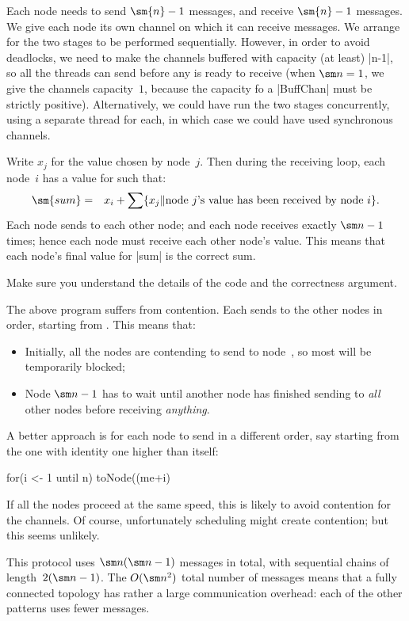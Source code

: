 
Each node needs to send $\sm{n}-1$ messages, and receive $\sm{n}-1$ messages.
We give each node its own channel on which it can receive messages.  We
arrange for the two stages to be performed sequentially.  However, in order to
avoid deadlocks, we need to make the channels buffered with capacity (at
least) |n-1|, so all the threads can send before any is ready to receive (when
$\sm n = 1$, we give the channels capacity~$1$, because the capacity fo a
|BuffChan| must be strictly positive).  Alternatively, we could have run the
two stages concurrently, using a separate thread for each, in which case we
could have used synchronous channels.

Write $x_j$ for the value chosen by node~$j$.  Then during the receiving loop,
each node~$i$ has a value for  such that:
%
\begin{eqnarray*}
\sm{sum} & = & 
  x_i + \sum \set{x_j \| \mbox{node~$j$'s value has been received by node~$i$}}.
\end{eqnarray*}
%
Each node sends to each other node; and each node receives exactly $\sm n-1$
times; hence each node must receive each other node's value.  This means that
each node's final value for |sum| is the correct sum.

\begin{instruction}
Make sure you understand the details of the code and the correctness
argument.
\end{instruction}


The above program suffers from contention.  
Each  sends to the other nodes in order, starting from
.  This means that:
%
\begin{itemize}
\item
Initially, all the nodes are contending to send to node~, so most
will be temporarily blocked;

\item
Node $\sm n-1$ has to wait until another node has finished sending to
\emph{all} other nodes before receiving \emph{anything}.  %
\end{itemize}

A better approach is for each node to send in a different order, say starting
from the one with identity one higher than itself:
%
\begin{scala}
  for(i <- 1 until n) toNode((me+i)%
\end{scala}
%
If all the nodes proceed at the same speed, this is likely to avoid contention
for the channels.  Of course, unfortunately scheduling might create
contention; but this seems unlikely. 


This protocol uses $\sm n(\sm n-1)$ messages in total, with sequential chains
of length~$2(\sm n -1)$.  The $O(\sm n^2)$ total number of messages means that
a fully connected topology has rather a large communication overhead: each of
the other patterns uses fewer messages. 
